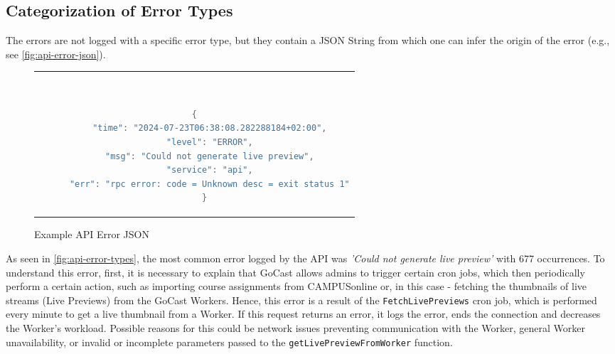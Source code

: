 
\subsection{Categorization of Error Types}

The errors are not logged with a specific error type, but they contain a JSON String from which one can infer the origin of the error (e.g., see \autoref{fig:api-error-json}).

\begin{figure}[htpb]
  \begin{tabular}{c}
  \ \small \begin{lstlisting}[language=Java]
    {
      "time": "2024-07-23T06:38:08.282288184+02:00",
      "level": "ERROR",
      "msg": "Could not generate live preview",
      "service": "api",
      "err": "rpc error: code = Unknown desc = exit status 1"
    }
    \end{lstlisting}
  \end{tabular}
  \caption[Example \ac{API} Error JSON]{Example \ac{API} Error JSON}\label{fig:api-error-json}
\end{figure}

\noindent As seen in \autoref{fig:api-error-types}, the most common error logged by the \ac{API} was \textit{'Could not generate live preview'} with 677 occurrences. To understand this error, first, it is necessary to explain that GoCast allows admins to trigger certain cron jobs, which then periodically perform a certain action, such as importing course assignments from CAMPUSonline or, in this case - fetching the thumbnails of live streams (Live Previews) from the GoCast Workers. Hence, this error is a result of the \texttt{FetchLivePreviews} cron job, which is performed every minute to get a live thumbnail from a Worker. If this request returns an error, it logs the error, ends the connection and decreases the Worker's workload. Possible reasons for this could be network issues preventing communication with the Worker, general Worker unavailability, or invalid or incomplete parameters passed to the \texttt{getLivePreviewFromWorker} function.

